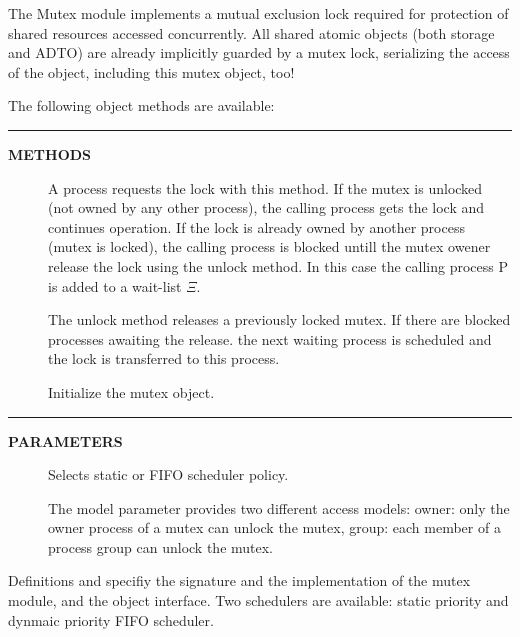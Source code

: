 \documentclass[a4paper,12pt,twoside,english]{article}
\begin{document}
\vskip5pt



\vskip5pt

\def\thesubsubsection{\tocXLIII}
\secIII{\label{toclabelXLIII}\thesubsubsection}
The Mutex module implements a mutual exclusion lock required for protection of shared resources
accessed concurrently. All shared atomic objects (both storage and ADTO) are already implicitly guarded by a mutex lock, serializing the access of the object,
including this mutex object, too!


\vskip5pt
The following object methods are available:


\vskip5pt
\vskip5pt\color{highlight-color}
{\rule[-1pt]{2em}{1em}\hskip15pt\bf METHODS

}
\color{black}

\begin{description}
\item[] $ $\\
A process requests the lock with this method. If the mutex is unlocked (not owned by any other process), the calling process gets the lock and continues
operation. If the lock is already owned by another process (mutex is locked), the calling process is blocked untill the mutex owener release the lock using the
unlock method. In this case the calling process P is added to a wait-list $\Xi$.

\item[] $ $\\
The unlock method releases a previously locked mutex. If there are blocked processes awaiting the release. the next waiting process is scheduled and the lock is
transferred to this process.

\item[] $ $\\
Initialize the mutex object.


\end{description}
\vskip5pt\color{highlight-color}
{\rule[-1pt]{2em}{1em}\hskip15pt\bf PARAMETERS

}
\color{black}

\begin{description}
\item[] $ $\\
Selects static or FIFO scheduler policy.

\item[] $ $\\
The model parameter provides two different access models: owner: only the owner process of a mutex can unlock the mutex,  group: each member of a process group
can unlock the mutex. 


\end{description}
Definitions  and  specifiy the signature and the implementation of the mutex module, and  the object interface.
Two schedulers are available: static priority and dynmaic priority FIFO scheduler.
\end{document}
